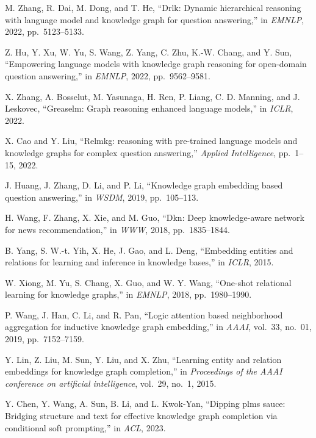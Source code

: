 \begin{enumerate}[leftmargin=2em,label={[\arabic*]}]
\item M. Zhang, R. Dai, M. Dong, and T. He, ``Drlk: Dynamic hierarchical reasoning with language model and knowledge graph for question answering,'' in \textit{EMNLP}, 2022, pp.~5123--5133.

\item Z. Hu, Y. Xu, W. Yu, S. Wang, Z. Yang, C. Zhu, K.-W. Chang, and Y. Sun, ``Empowering language models with knowledge graph reasoning for open-domain question answering,'' in \textit{EMNLP}, 2022, pp.~9562--9581.

\item X. Zhang, A. Bosselut, M. Yasunaga, H. Ren, P. Liang, C. D. Manning, and J. Leskovec, ``Greaselm: Graph reasoning enhanced language models,'' in \textit{ICLR}, 2022.

\item X. Cao and Y. Liu, ``Relmkg: reasoning with pre-trained language models and knowledge graphs for complex question answering,'' \textit{Applied Intelligence}, pp.~1--15, 2022.

\item J. Huang, J. Zhang, D. Li, and P. Li, ``Knowledge graph embedding based question answering,'' in \textit{WSDM}, 2019, pp.~105--113.

\item H. Wang, F. Zhang, X. Xie, and M. Guo, ``Dkn: Deep knowledge-aware network for news recommendation,'' in \textit{WWW}, 2018, pp.~1835--1844.

\item B. Yang, S. W.-t. Yih, X. He, J. Gao, and L. Deng, ``Embedding entities and relations for learning and inference in knowledge bases,'' in \textit{ICLR}, 2015.

\item W. Xiong, M. Yu, S. Chang, X. Guo, and W. Y. Wang, ``One-shot relational learning for knowledge graphs,'' in \textit{EMNLP}, 2018, pp.~1980--1990.

\item P. Wang, J. Han, C. Li, and R. Pan, ``Logic attention based neighborhood aggregation for inductive knowledge graph embedding,'' in \textit{AAAI}, vol.~33, no.~01, 2019, pp.~7152--7159.

\item Y. Lin, Z. Liu, M. Sun, Y. Liu, and X. Zhu, ``Learning entity and relation embeddings for knowledge graph completion,'' in \textit{Proceedings of the AAAI conference on artificial intelligence}, vol.~29, no.~1, 2015.

\item Y. Chen, Y. Wang, A. Sun, B. Li, and L. Kwok-Yan, ``Dipping plms sauce: Bridging structure and text for effective knowledge graph completion via conditional soft prompting,'' in \textit{ACL}, 2023.


\end{enumerate}
